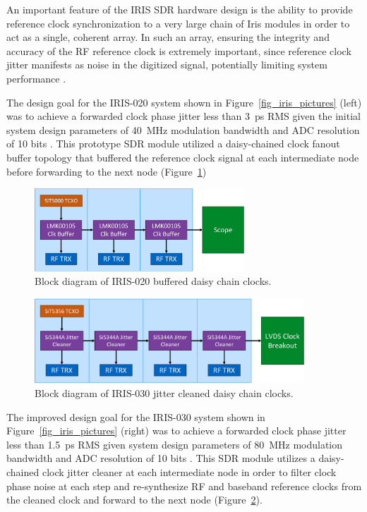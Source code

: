 	An important feature of the IRIS \ac{SDR} hardware design is the ability to provide reference clock synchronization to a very large chain of Iris modules in order to act as a single, coherent array.
	In such an array, ensuring the integrity and accuracy of the RF reference clock is extremely important, since reference clock jitter manifests as noise in the digitized signal, potentially limiting system performance \cite{brannon2006jitter}.
	
	The design goal for the IRIS-020 system shown in Figure~\ref{fig_iris_pictures} (left) was to achieve a forwarded clock phase jitter less than 3~ps RMS given the initial system design parameters of 40~MHz modulation bandwidth and \ac{ADC} resolution of 10 bits \cite{brannon2006jitter}.
	This prototype \ac{SDR} module utilized a daisy-chained clock fanout buffer topology that buffered the reference clock signal at each intermediate node before forwarding to the next node (Figure~\ref{fig_020_chain})
	
\begin{figure}[p]
\centering
\includegraphics[width=0.7\textwidth]{figs/clk/iris020_diagram}
\caption{Block diagram of IRIS-020 buffered daisy chain clocks.}
\label{fig_020_chain}
\end{figure}

\begin{figure}[p]
\centering
\includegraphics[width=0.9\textwidth]{figs/clk/iris030_diagram}
\caption{Block diagram of IRIS-030 jitter cleaned daisy chain clocks.}
\label{fig_030_chain}
\end{figure}
	
	The improved design goal for the IRIS-030 system shown in Figure~\ref{fig_iris_pictures} (right) was to achieve a forwarded clock phase jitter less than 1.5~ps RMS given system design parameters of 80~MHz modulation bandwidth and \ac{ADC} resolution of 10 bits \cite{brannon2006jitter}.
	This \ac{SDR} module utilizes a daisy-chained clock jitter cleaner at each intermediate node in order to filter clock phase noise at each step and re-synthesize RF and baseband reference clocks from the cleaned clock and forward to the next node (Figure~\ref{fig_030_chain}).
	
